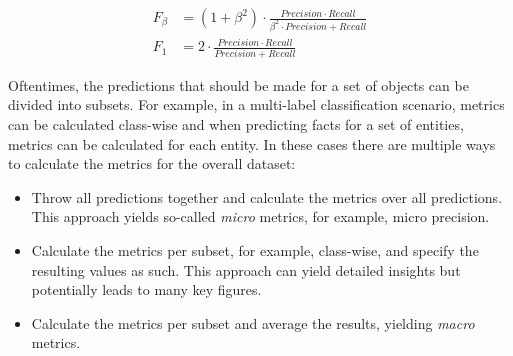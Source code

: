 \begin{align}
    F_\beta &= (1 + \beta^2) \cdot \frac{Precision \cdot Recall}{\beta^2 \cdot Precision + Recall}
    \label{eq:2_basics/2_metrics/2_prf/f_beta} \\
    F_1 &= 2 \cdot \frac{Precision \cdot Recall}{Precision + Recall}
    \label{eq:2_basics/2_metrics/2_prf/f_1}
\end{align}

Oftentimes, the predictions that should be made for a set of objects can be divided into subsets. For example, in a multi-label classification scenario, metrics can be calculated class-wise and when predicting facts for a set of entities, metrics can be calculated for each entity. In these cases there are multiple ways to calculate the metrics for the overall dataset:

\begin{itemize}
    \item Throw all predictions together and calculate the metrics over all predictions. This approach yields so-called \emph{micro} metrics, for example, micro precision.

    \item Calculate the metrics per subset, for example, class-wise, and specify the resulting values as such. This approach can yield detailed insights but potentially leads to many key figures.

    \item Calculate the metrics per subset and average the results, yielding \emph{macro} metrics.
\end{itemize}

